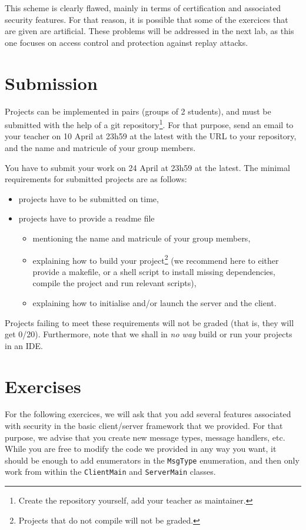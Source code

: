 \documentclass[a4paper,11pt]{article}
\newcommand{\deadline}{24 April at 23h59\xspace}
\newcommand{\deadlinesubscription}{10 April at 23h59\xspace}
\begin{document}
This scheme is clearly flawed, mainly in terms of certification and associated security features. For that reason, it is possible that some of the exercices that are given are artificial. These problems will be addressed in the next lab, as this one focuses on access control and protection against replay attacks.

\section*{Submission}

Projects can be implemented in pairs (groups of 2 students), and must be submitted with the help of a git repository\footnote{Create the repository yourself, add your teacher as maintainer.}.
For that purpose, send an email to your teacher on \deadlinesubscription at the latest with the URL to your repository, and the name and matricule of your group members.

You have to submit your work on \deadline at the latest. The minimal requirements for submitted projects are as follows:
\begin{itemize}
\item projects have to be submitted on time,
\item projects have to provide a readme file
	\begin{itemize}
	\item mentioning the name and matricule of your group members,
	\item explaining how to build your project\footnote{Projects that do not compile will not be graded.} (we recommend here to either provide a makefile, or a shell script to install missing dependencies, compile the project and run relevant scripts),
	\item explaining how to initialise and/or launch the server and the client.	
	\end{itemize}
\end{itemize}

Projects failing to meet these requirements will not be graded (that is, they will get 0/20). Furthermore, note that we shall in \emph{no way} build or run your projects in an IDE.

\section*{Exercises}

For the following exercices, we will ask that you add several features associated with security in the basic client/server framework that we provided. For that purpose, we advise that you create new message types, message handlers, etc. While you are free to modify the code we provided in any way you want, it should be enough to add enumerators in the \texttt{MsgType} enumeration, and then only work from within the \texttt{ClientMain} and \texttt{ServerMain} classes.
\end{document}
